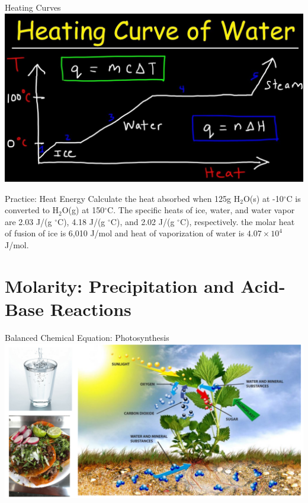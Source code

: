 \documentclass[11pt]{beamer}
\begin{document}
\begin{frame}{Heating Curves}
  \centering
  \includegraphics[width=\linewidth]{heating_curve_h2o}
\end{frame}

\begin{frame}{Practice: Heat Energy}
  Calculate the heat absorbed when 125g H$_2$O(s) at -10$^\circ$C
  is converted to H$_2$O(g) at 150$^\circ$C. The specific heats of ice,
  water, and water vapor are 2.03 J/(g $^\circ$C), 4.18 J/(g $^\circ$C),
  and 2.02 J/(g $^\circ$C), respectively. the molar heat of fusion of ice
  is 6,010 J/mol and heat of vaporization of water is $4.07 \times 10^4$
  J/mol.
  \vspace{1.4in}
\end{frame}

\section{Molarity: Precipitation and Acid-Base Reactions}

\begin{frame}{Balanced Chemical Equation: Photosynthesis}
  \centering
  \includegraphics[trim={8in 0 0 0},clip,width=1\linewidth]{food_pic}
\end{frame}
\end{document}
